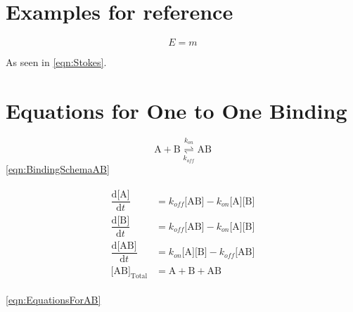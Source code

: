 \documentclass{article}
\newcommand{\kon}{k_{on}}
\newcommand{\koff}{k_{off}}
\newcommand{\Entity}[1]{\textrm{#1}}
\newcommand{\Conc}[1]{\textrm{[#1]}}
\newcommand{\Total}[1]{\Conc{#1}_\textrm{Total}}
\newcommand{\DCDt}[1]{\dfrac{\mathrm{d}\Conc{#1}}{\mathrm{d}t}}
\newcommand{\A}{\Entity{A}}
\newcommand{\B}{\Entity{B}}
\newcommand{\AB}{\Entity{AB}}
\begin{document}
\section*{Examples for reference}
\begin{equation}
	\tag{*} %
	E=m
	\label{eqn:Stokes}
\end{equation}

As seen in \eqref{eqn:Stokes}.


\section*{Equations for One to One Binding}

\begin{equation}
	\A + \B \overset{\kon}{\underset{\koff}{\rightleftharpoons}}\AB
	\label{eqn:BindingSchemaAB}
\end{equation}
\eqref{eqn:BindingSchemaAB}

\begin{align}
\begin{split}
	\DCDt{A} &= \koff\Conc{AB} - \kon\Conc{A}\Conc{B}	\\
	\DCDt{B} &= \koff\Conc{AB} - \kon\Conc{A}\Conc{B}	\\
	\DCDt{AB} &= \kon\Conc{A}\Conc{B} - \koff\Conc{AB}	\\
	\Total{AB} &= \A + \B + \AB
	\label{eqn:EquationsForAB}
\end{split}
\end{align}

\eqref{eqn:EquationsForAB}
\end{document}
